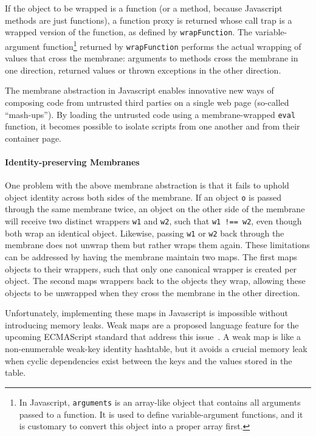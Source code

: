 \documentclass{sig-alternate}
\begin{document}
If the object to be wrapped is a function (or a method, because Javascript methods are just functions), a function proxy is returned whose call trap is a wrapped version of the function, as defined by \texttt{wrapFunction}. The variable-argument function\footnote{In Javascript, \texttt{arguments} is an array-like object that contains all arguments passed to a function. It is used to define variable-argument functions, and it is customary to convert this object into a proper array first.} returned by \texttt{wrapFunction} performs the actual wrapping of values that cross the membrane: arguments to methods cross the membrane in one direction, returned values or thrown exceptions in the other direction.

The membrane abstraction in Javascript enables innovative new ways of composing code from untrusted third parties on a single web page (so-called ``mash-ups''). By loading the untrusted code using a membrane-wrapped \texttt{eval} function, it becomes possible to isolate scripts from one another and from their container page.

\paragraph{Identity-preserving Membranes} One problem with the above membrane abstraction is that it fails to uphold object identity across both sides of the membrane. If an object \texttt{o} is passed through the same membrane twice, an object on the other side of the membrane will receive two distinct wrappers \texttt{w1} and \texttt{w2}, such that \texttt{w1~!==~w2}, even though both wrap an identical object. Likewise, passing \texttt{w1} or \texttt{w2} back through the membrane does not unwrap them but rather wraps them again. These limitations can be addressed by having the membrane maintain two maps. The first maps objects to their wrappers, such that only one canonical wrapper is created per object. The second maps wrappers back to the objects they wrap, allowing these objects to be unwrapped when they cross the membrane in the other direction.

Unfortunately, implementing these maps in Javascript is impossible without introducing memory leaks. Weak maps are a proposed language feature for the upcoming ECMAScript standard that address this issue~\cite{miller10et}. A weak map is like a non-enumerable weak-key identity hashtable, but it avoids a crucial memory leak when cyclic dependencies exist between the keys and the values stored in the table.
\end{document}
